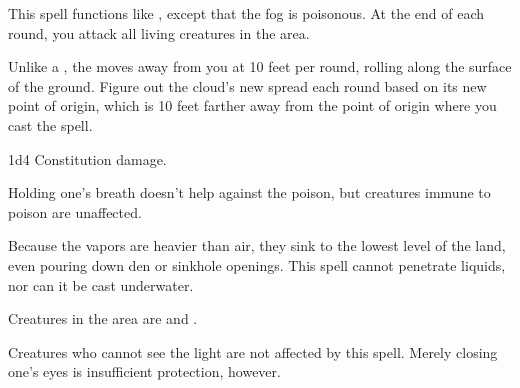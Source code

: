 \begin{spelleffect}
    This spell functions like , except that the fog is poisonous. At the end of each round, you attack all living creatures in the area.
  \par Unlike a , the  moves away from you at 10 feet per round, rolling along the surface of the ground. Figure out the cloud's new spread each round based on its new point of origin, which is 10 feet farther away from the point of origin where you cast the spell.
\end{spelleffect}
\begin{spellsuccess}
    1d4 Constitution damage.
\end{spellsuccess}
\begin{spellnotes}
  Holding one's breath doesn't help against the poison, but creatures immune to poison are unaffected.
  \par Because the vapors are heavier than air, they sink to the lowest level of the land, even pouring down den or sinkhole openings. This spell cannot penetrate liquids, nor can it be cast underwater.
\end{spellnotes}

\begin{spelleffect}
    Creatures in the area are \dazzled and \bewildered.
\end{spelleffect}
\begin{spellnotes}
  Creatures who cannot see the light are not affected by this spell. Merely closing one's eyes is insufficient protection, however.
\end{spellnotes}

